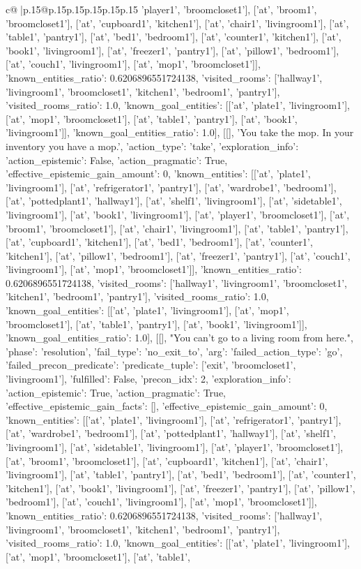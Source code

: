 \documentclass{article}
\begin{document}
{\begin{supertabular}{c@{$\;$}|p{.15\linewidth}@{}p{.15\linewidth}p{.15\linewidth}p{.15\linewidth}p{.15\linewidth}p{.15\linewidth}}
{{{'player1', 'broomcloset1'], ['at', 'broom1', 'broomcloset1'], ['at', 'cupboard1', 'kitchen1'], ['at', 'chair1', 'livingroom1'], ['at', 'table1', 'pantry1'], ['at', 'bed1', 'bedroom1'], ['at', 'counter1', 'kitchen1'], ['at', 'book1', 'livingroom1'], ['at', 'freezer1', 'pantry1'], ['at', 'pillow1', 'bedroom1'], ['at', 'couch1', 'livingroom1'], ['at', 'mop1', 'broomcloset1']], 'known_entities_ratio': 0.6206896551724138, 'visited_rooms': ['hallway1', 'livingroom1', 'broomcloset1', 'kitchen1', 'bedroom1', 'pantry1'], 'visited_rooms_ratio': 1.0, 'known_goal_entities': [['at', 'plate1', 'livingroom1'], ['at', 'mop1', 'broomcloset1'], ['at', 'table1', 'pantry1'], ['at', 'book1', 'livingroom1']], 'known_goal_entities_ratio': 1.0}}], [[], 'You take the mop. In your inventory you have a mop.', {'action_type': 'take', 'exploration_info': {'action_epistemic': False, 'action_pragmatic': True, 'effective_epistemic_gain_amount': 0, 'known_entities': [['at', 'plate1', 'livingroom1'], ['at', 'refrigerator1', 'pantry1'], ['at', 'wardrobe1', 'bedroom1'], ['at', 'pottedplant1', 'hallway1'], ['at', 'shelf1', 'livingroom1'], ['at', 'sidetable1', 'livingroom1'], ['at', 'book1', 'livingroom1'], ['at', 'player1', 'broomcloset1'], ['at', 'broom1', 'broomcloset1'], ['at', 'chair1', 'livingroom1'], ['at', 'table1', 'pantry1'], ['at', 'cupboard1', 'kitchen1'], ['at', 'bed1', 'bedroom1'], ['at', 'counter1', 'kitchen1'], ['at', 'pillow1', 'bedroom1'], ['at', 'freezer1', 'pantry1'], ['at', 'couch1', 'livingroom1'], ['at', 'mop1', 'broomcloset1']], 'known_entities_ratio': 0.6206896551724138, 'visited_rooms': ['hallway1', 'livingroom1', 'broomcloset1', 'kitchen1', 'bedroom1', 'pantry1'], 'visited_rooms_ratio': 1.0, 'known_goal_entities': [['at', 'plate1', 'livingroom1'], ['at', 'mop1', 'broomcloset1'], ['at', 'table1', 'pantry1'], ['at', 'book1', 'livingroom1']], 'known_goal_entities_ratio': 1.0}}], [[], "You can't go to a living room from here.", {'phase': 'resolution', 'fail_type': 'no_exit_to', 'arg': {'failed_action_type': 'go', 'failed_precon_predicate': {'predicate_tuple': ['exit', 'broomcloset1', 'livingroom1'], 'fulfilled': False, 'precon_idx': 2}}, 'exploration_info': {'action_epistemic': True, 'action_pragmatic': True, 'effective_epistemic_gain_facts': [], 'effective_epistemic_gain_amount': 0, 'known_entities': [['at', 'plate1', 'livingroom1'], ['at', 'refrigerator1', 'pantry1'], ['at', 'wardrobe1', 'bedroom1'], ['at', 'pottedplant1', 'hallway1'], ['at', 'shelf1', 'livingroom1'], ['at', 'sidetable1', 'livingroom1'], ['at', 'player1', 'broomcloset1'], ['at', 'broom1', 'broomcloset1'], ['at', 'cupboard1', 'kitchen1'], ['at', 'chair1', 'livingroom1'], ['at', 'table1', 'pantry1'], ['at', 'bed1', 'bedroom1'], ['at', 'counter1', 'kitchen1'], ['at', 'book1', 'livingroom1'], ['at', 'freezer1', 'pantry1'], ['at', 'pillow1', 'bedroom1'], ['at', 'couch1', 'livingroom1'], ['at', 'mop1', 'broomcloset1']], 'known_entities_ratio': 0.6206896551724138, 'visited_rooms': ['hallway1', 'livingroom1', 'broomcloset1', 'kitchen1', 'bedroom1', 'pantry1'], 'visited_rooms_ratio': 1.0, 'known_goal_entities': [['at', 'plate1', 'livingroom1'], ['at', 'mop1', 'broomcloset1'], ['at', 'table1', }}}
\end{supertabular}}
\end{document}
